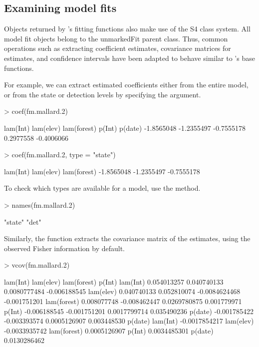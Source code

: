 \documentclass[article,shortnames]{jss}
\newcommand{\um}{\pkg{unmarked}}
\newcommand{\rlang}{\proglang{R}}
\begin{document}
\subsection{Examining model fits}
\label{sec:examining-model-fits}

Objects returned by \um's fitting functions also make use of the S4
class system.  All model fit objects belong to the unmarkedFit parent
class.  Thus, common operations such as extracting coefficient
estimates, covariance matrices for estimates, and confidence intervals
have been adapted to behave similar to \rlang's base functions.


For example, we can extract estimated coefficients either from the
entire model, or from the state or detection levels by specifying the
 argument.

\begin{Schunk}
\begin{Sinput}
> coef(fm.mallard.2)
\end{Sinput}
\begin{Soutput}
   lam(Int)   lam(elev) lam(forest)      p(Int)     p(date) 
 -1.8565048  -1.2355497  -0.7555178   0.2977558  -0.4006066 
\end{Soutput}
\begin{Sinput}
> coef(fm.mallard.2, type = "state")
\end{Sinput}
\begin{Soutput}
   lam(Int)   lam(elev) lam(forest) 
 -1.8565048  -1.2355497  -0.7555178 
\end{Soutput}
\end{Schunk}

To check which types are available for a model, use the  method.

\begin{Schunk}
\begin{Sinput}
> names(fm.mallard.2)
\end{Sinput}
\begin{Soutput}
[1] "state" "det"  
\end{Soutput}
\end{Schunk}

Similarly, the  function extracts the covariance matrix of
the estimates, using the observed Fisher information by default.

\begin{Schunk}
\begin{Sinput}
> vcov(fm.mallard.2)
\end{Sinput}
\begin{Soutput}
                lam(Int)    lam(elev)   lam(forest)       p(Int)
lam(Int)     0.054013257  0.040740133  0.0080777484 -0.006188545
lam(elev)    0.040740133  0.052810074 -0.0084624468 -0.001751201
lam(forest)  0.008077748 -0.008462447  0.0269780875  0.001779971
p(Int)      -0.006188545 -0.001751201  0.0017799714  0.035490236
p(date)     -0.001785422 -0.003393574  0.0005126907  0.003448530
                  p(date)
lam(Int)    -0.0017854217
lam(elev)   -0.0033935742
lam(forest)  0.0005126907
p(Int)       0.0034485301
p(date)      0.0130286462
\end{Soutput}
\end{Schunk}
\end{document}
